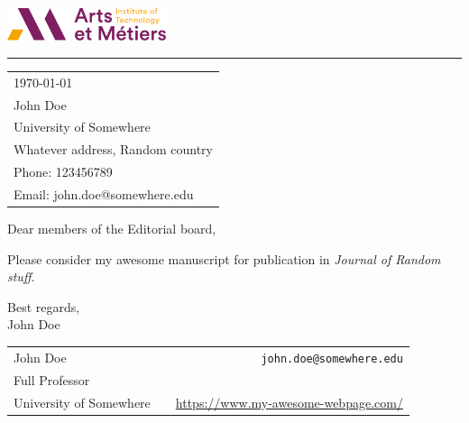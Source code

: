 \documentclass{article}
\begin{document}

\includegraphics[width=0.35\textwidth]{logo.png} %

\vspace{-1em} %

\rule{\linewidth}{1pt} %

\bigskip\bigskip %


\hfill
\begin{tabular}{l @{}}
	\today \bigskip\\ %
	John Doe\\
	University of Somewhere \\ %
	Whatever address, Random country \\
	Phone: 123456789  \\
	Email: john.doe@somewhere.edu
\end{tabular}

\bigskip %



Dear members of the Editorial board,

Please consider my awesome manuscript for publication in \emph{Journal of Random stuff}.

\begin{flushright}
  Best regards, \\
  John Doe
\end{flushright}

\newpage


\begin{center}
  \begin{tabular}{lcr}
    John Doe & & \texttt{john.doe@somewhere.edu} \\
    Full Professor & &\\
    University of Somewhere  & & \url{https://www.my-awesome-webpage.com/}\\
  \end{tabular}
\end{center}
\end{document}
